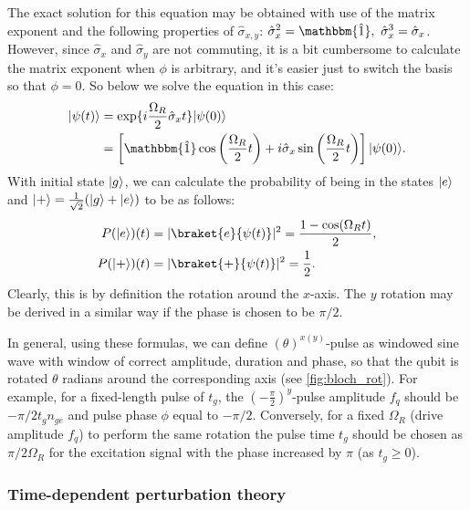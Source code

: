 The exact solution for this equation may be obtained with use of the matrix exponent and the following properties of $\hat \sigma_{x,y}$: $\hat \sigma_x^2 = \mathbbm{\hat 1},\ \hat \sigma_x^3 = \hat\sigma_x$. However, since $\hat \sigma_x$ and $\hat \sigma_y$ are not commuting, it is a bit cumbersome to calculate the matrix exponent when $\phi$ is arbitrary, and it's easier just to switch the basis so that $\phi=0$. So below we solve the equation in this case:
\begin{equation}
\begin{aligned}
\ket{\psi(t)} &= \exp\{i\frac{\Omega_R}{2}\hat \sigma_x t\} \ket{\psi(0)}\\
& = \left[\mathbbm{\hat 1} \cos\left(\frac{\Omega_R}{2}  t\right) + i\hat \sigma_x \sin\left(\frac{\Omega_R}{2} t\right)\right]\ket{\psi(0)}. 
\end{aligned}
\end{equation}
With initial state $\lvert g\rangle$, we can calculate the probability of being in the states $\lvert e\rangle$ and $\lvert+\rangle = \frac{1}{\sqrt{2}}(\lvert g\rangle+\lvert e\rangle)$ to be  as follows:
\begin{equation}
\begin{aligned}
P(\ket{e})(t) &= |\braket{e}{\psi(t)}|^2 = \frac{1-\cos(\Omega_R t)}{2},\\
P(\ket{+})(t) &= |\braket{+}{\psi(t)}|^2 = \frac{1}{2}.
\end{aligned}
\label{eq:x_rotation}
\end{equation}
Clearly, this is by definition the rotation around the $x$-axis. The $y$ rotation may be derived in a similar way if the phase is chosen to be $\pi/2$. 

In general, using these formulas, we can define $(\theta)^{x(y)}$-pulse as windowed sine wave with window of correct amplitude, duration and phase, so that the qubit is rotated $\theta$ radians around the corresponding axis (see \autoref{fig:bloch_rot}). For example, for a fixed-length pulse of $t_g$, the $(-\frac{\pi}{2})^{y}$-pulse amplitude $f_q$ should be $- \pi/2 t_g n_{ge}$ and pulse phase $\phi$ equal to $-\pi/2$. Conversely, for a fixed $\Omega_R$ (drive amplitude $f_q$) to perform the same rotation the pulse time $t_g$ should be chosen as $\pi/2\Omega_R$ for the excitation signal with the phase increased by $\pi$ (as $t_g\geq 0$).

\subsubsection{Time-dependent perturbation theory}

